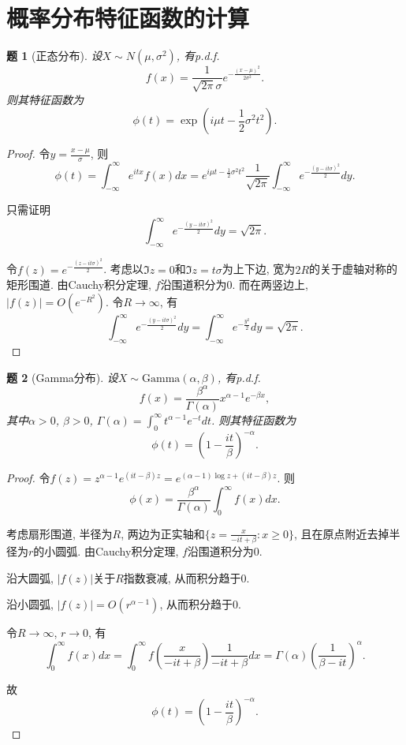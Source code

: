 \documentclass{article}[a4paper, 12pt]
\theoremstyle{mystyle}
\newtheorem{problem}{题}
\begin{document}
\section{概率分布特征函数的计算}

\begin{problem}[正态分布]
  设\(X\sim N(\mu,\sigma^2)\), 有p.d.f. \[f(x)=\frac{1}{\sqrt{2\pi}\sigma}e^{-\frac{(x-\mu)^2}{2\sigma^2}}.\] 则其特征函数为\[\phi(t)=\exp\left(i\mu t-\frac12 \sigma^2t^2\right).\]
\end{problem}

\begin{proof}
  令\(y=\frac{x-\mu}{\sigma}\), 则\[
    \phi(t)=\int_{-\infty}^\infty e^{itx}f(x)dx=e^{i\mu t-\frac12\sigma^2t^2}\frac{1}{\sqrt{2\pi}}\int_{-\infty}^\infty e^{-\frac{(y-it\sigma)^2}{2}}dy.\]

  只需证明\[\int_{-\infty}^\infty e^{-\frac{(y-it\sigma)^2}{2}}dy=\sqrt{2\pi}.\]

  令\(f(z)=e^{-\frac{(z-it\sigma)^2}{2}}\). 考虑以\(\Im z=0\)和\(\Im z=t\sigma\)为上下边, 宽为\(2R\)的关于虚轴对称的矩形围道. 由Cauchy积分定理, \(f\)沿围道积分为\(0\). 而在两竖边上, \(|f(z)|=O(e^{-R^2})\). 令\(R\to\infty\), 有\[\int_{-\infty}^\infty e^{-\frac{(y-it\sigma)^2}{2}}dy=\int_{-\infty}^\infty e^{-\frac{y^2}{2}}dy=\sqrt{2\pi}.\tag*{\(\qed\)}\]
  \renewcommand{\qedsymbol}{}
\end{proof}

\begin{problem}[Gamma分布]
  设\(X\sim \text{Gamma}(\alpha,\beta)\), 有p.d.f. \[f(x)=\frac{\beta^\alpha}{\Gamma(\alpha)}x^{\alpha-1}e^{-\beta x},\] 其中\(\alpha>0\), \(\beta>0\), \(\Gamma(\alpha)=\int_0^\infty t^{\alpha-1}e^{-t}dt\). 则其特征函数为\[\phi(t)=\left(1-\frac{it}{\beta}\right)^{-\alpha}.\] 
\end{problem}

\begin{proof}
  令\(f(z)=z^{\alpha-1}e^{(it-\beta)z}=e^{(\alpha-1)\log z+(it-\beta)z}\). 则\[\phi(x)=\frac{\beta^\alpha}{\Gamma(\alpha)}\int_0^\infty f(x)dx.\]

  考虑扇形围道, 半径为\(R\), 两边为正实轴和\(\{z=\frac{x}{-it+\beta}:x\ge0\}\), 且在原点附近去掉半径为\(r\)的小圆弧. 由Cauchy积分定理, \(f\)沿围道积分为\(0\).

  沿大圆弧, \(|f(z)|\)关于\(R\)指数衰减, 从而积分趋于\(0\).
  
  沿小圆弧, \(|f(z)|=O(r^{\alpha-1})\), 从而积分趋于\(0\).

  令\(R\to\infty\), \(r\to0\), 有\[\int_0^\infty f(x)dx=\int_0^\infty f\left(\frac{x}{-it+\beta}\right)\frac{1}{-it+\beta}dx=\Gamma(\alpha)\left(\frac{1}{\beta-it}\right)^\alpha.\]

  故\[\phi(t)=\left(1-\frac{it}{\beta}\right)^{-\alpha}.\tag*{\(\qed\)}\]
  \renewcommand{\qedsymbol}{}
\end{proof}
\end{document}
